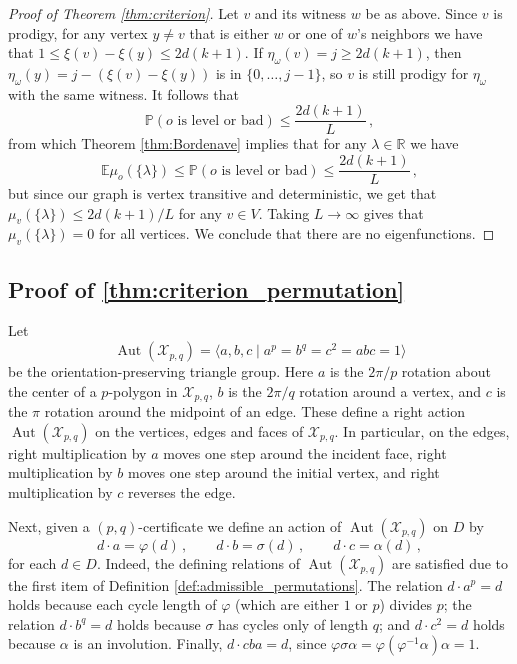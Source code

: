 \documentclass[11pt]{article}
\theoremstyle{remark}
\newcommand{\cX}{\mathcal X}
\newcommand{\R}{\mathbb R}
\begin{document}
\begin{proof}[Proof of Theorem \ref{thm:criterion}]
Let $v$ and its witness $w$ be as above. Since $v$ is prodigy, for any vertex $y\neq v$ that is either $w$ or one of $w$'s neighbors we have that $1 \leq \xi(v)-\xi(y) \leq 2d(k+1)$. If $\eta_\omega(v) = j \geq 2d(k+1)$, then $\eta_\omega(y) = j - (\xi(v)-\xi(y))$ is in $\{0,\ldots, j-1\}$, so $v$ is still prodigy for $\eta_\omega$ with the same witness. It follows that 
$$ \mathbb P(o\text{ is level or bad})\leq\frac{2d(k+1)}{L} \, ,$$
from which Theorem \ref{thm:Bordenave} implies that for any $\lambda\in \R$
we have
$$ \mathbb E\mu_o(\{\lambda\})
  \leq\mathbb P(o\text{ is level or bad})
  \leq\frac{2d(k+1)}{L} \, ,$$
but since our graph is vertex transitive and deterministic, we get that $\mu_v(\{\lambda\}) \leq 2d(k+1)/L$ for any $v\in V$. Taking $L\to\infty$ gives that $\mu_v(\{\lambda\})=0$ for all vertices. We conclude that there are no eigenfunctions. 
\end{proof}



\subsection{Proof of \cref{thm:criterion_permutation}} \label{sec:criterion_permutation}
Let
\[
  \operatorname{Aut}(\cX_{p,q}) =\langle a,b,c\mid a^p=b^q=c^2=abc=1\rangle 
\]
be the orientation-preserving triangle group.  Here \(a\) is the $2\pi/p$ rotation about
the center of a $p$-polygon in $\cX_{p,q}$, \(b\) is the $2\pi/q$ rotation around a vertex, and \(c\) is
the $\pi$ rotation around the midpoint of an edge. These define a right action  $\operatorname{Aut}(\cX_{p,q})$ on the vertices, edges and faces of $\cX_{p,q}$. In particular, on the edges, right multiplication by \(a\) moves one step
around the incident face, right multiplication by \(b\) moves one step around
the initial vertex, and right multiplication by \(c\) reverses the edge.


Next, given a $(p,q)$-certificate we define an action of $\operatorname{Aut}(\cX_{p,q})$ on $D$ by
\[
  d\cdot a=\varphi(d) \, ,
  \qquad
  d\cdot b=\sigma(d) \, ,
  \qquad
  d\cdot c=\alpha(d) \, ,
\]
for each $d\in D$. Indeed, the defining relations of \(\operatorname{Aut}(\cX_{p,q})\) are satisfied due to the first item of Definition \ref{def:admissible_permutations}.  The relation
$d\cdot a^p=d$ holds because each cycle length of $\varphi$ (which are either $1$ or $p$) divides $p$;
the relation $d\cdot b^q=d$ holds because $\sigma$ has cycles only of length $q$; and
$d\cdot c^2=d$ holds because \(\alpha\) is an involution.  Finally, $d\cdot cba = d$, since
$\varphi\sigma\alpha   =\varphi(\varphi^{-1}\alpha)\alpha
  =1$.
  
\end{document}
